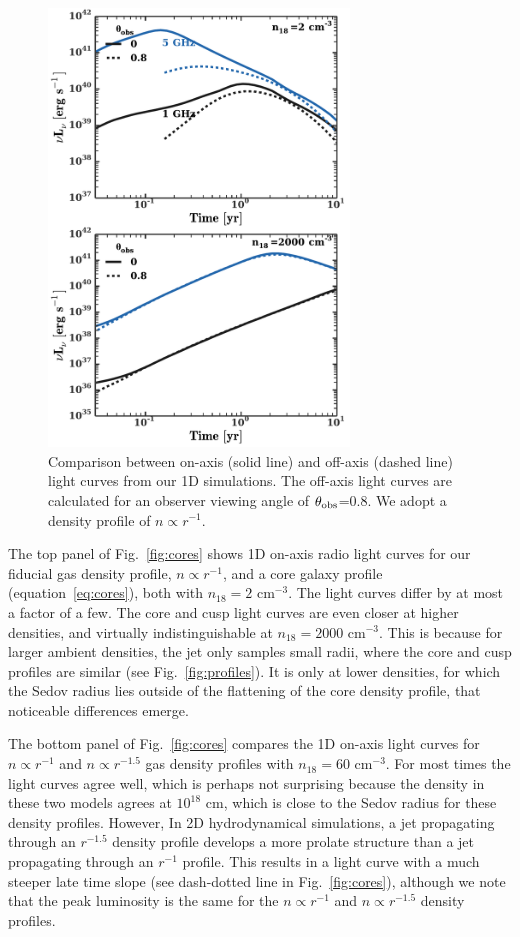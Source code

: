 \documentclass[usenatbib,fleqn]{mnras}
\begin{document}
\begin{figure}
\includegraphics[width=8cm]{on_off.pdf}
\caption{\label{fig:onOff} Comparison between on-axis (solid line) and
  off-axis (dashed line) light curves from our 1D simulations.  The
  off-axis light curves are calculated for an observer viewing angle
  of $\theta_{\rm obs}$=0.8.  We adopt a density profile of $n\propto
  r^{-1}$.}
\end{figure}

\label{sec:profileComp}
The top panel of Fig.~\ref{fig:cores} shows 1D on-axis radio light
curves for our fiducial gas density profile, $n\propto r^{-1}$, and a
core galaxy profile (equation~\ref{eq:cores}), both with $n_{18}=2$
cm$^{-3}$.  The light curves differ by at most a factor of a few. The
core and cusp light curves are even closer at higher densities, and
virtually indistinguishable at $n_{18}=2000$ cm$^{-3}$. This is
because for larger ambient densities, the jet only samples small
radii, where the core and cusp profiles are similar (see
Fig.~\ref{fig:profiles}). It is only at lower densities, for which the
Sedov radius lies outside of the flattening of the core density
profile, that noticeable differences emerge.

The bottom panel of Fig.~\ref{fig:cores} compares the 1D on-axis light
curves for $n\propto r^{-1}$ and $n\propto r^{-1.5}$ gas density
profiles with $n_{18}=60$ cm$^{-3}$. For most times the light curves
agree well, which is perhaps not surprising because the density in
these two models agrees at $10^{18}$ cm, which is close to the Sedov
radius for these density profiles. However, In 2D hydrodynamical
simulations, a jet propagating through an $r^{-1.5}$ density profile
develops a more prolate structure than a jet propagating through an
$r^{-1}$ profile. This results in a light curve with a much steeper
late time slope (see dash-dotted line in Fig.~\ref{fig:cores}),
although we note that the peak luminosity is the same for the
$n\propto r^{-1}$ and $n\propto r^{-1.5}$ density profiles.
\end{document}
